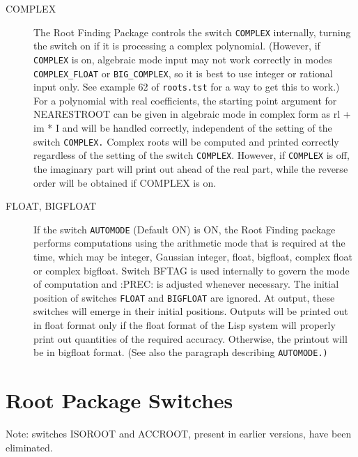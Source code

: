 \begin{description}
\item[COMPLEX] The Root Finding Package controls the switch {\tt COMPLEX}
internally, turning the switch on if it is processing a complex
polynomial. (However, if {\tt COMPLEX} is on, algebraic mode input may not
work correctly in modes {\tt COMPLEX\_FLOAT} or {\tt BIG\_COMPLEX}, so it is
best to
use integer or rational input only.  See example 62 of {\tt roots.tst} for a
way to get this to work.) For a polynomial with real coefficients, the
starting point argument for NEARESTROOT can be given in algebraic mode
in complex form as rl + im * I  and will be handled correctly,
independent of the setting of the switch {\tt COMPLEX.} Complex roots will be
computed and printed correctly regardless of the setting of the switch
{\tt COMPLEX}.  However, if {\tt COMPLEX} is off, the imaginary part will
print out ahead of the real part, while the reverse order will be obtained if
COMPLEX is on.

 
\item[FLOAT, BIGFLOAT] If the switch {\tt AUTOMODE} (Default ON) is ON, the
Root Finding package performs computations using the arithmetic mode that is
required at the time, which may be integer, Gaussian integer, float,
bigfloat, complex float or complex bigfloat.  Switch BFTAG is used internally
to govern the mode of computation and :PREC: is adjusted whenever necessary.
The initial position of switches {\tt FLOAT} and {\tt BIGFLOAT} are ignored.
At output, these switches will emerge in their initial positions.  Outputs
will be printed out in float format only if the float format of the Lisp
system will properly print out quantities of the required accuracy.
Otherwise, the printout will be in bigfloat format. (See also the paragraph
describing {\tt AUTOMODE.)} 
\end{description}

\section{Root Package Switches}

Note: switches ISOROOT and ACCROOT, present in earlier versions, have been
eliminated.

